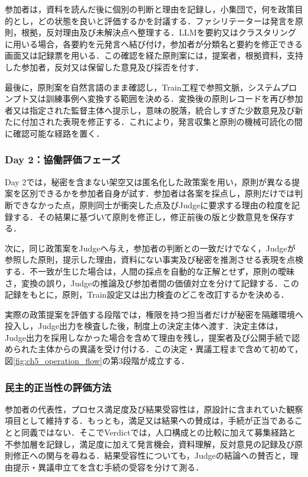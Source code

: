 参加者は，資料を読んだ後に個別の判断と理由を記録し，小集団で，何を政策目的とし，どの状態を良いと評価するかを討議する．ファシリテーターは発言を原則，根拠，反対理由及び未解決点へ整理する．LLMを要約又はクラスタリングに用いる場合，各要約を元発言へ結び付け，参加者が分類名と要約を修正できる画面又は記録票を用いる．この確認を経た原則案には，提案者，根拠資料，支持した参加者，反対又は保留した意見及び採否を付す．

最後に，原則案を自然言語のまま確認し，Train工程で参照文脈，システムプロンプト又は訓練事例へ変換する範囲を決める．変換後の原則レコードを再び参加者又は指定された監督主体へ提示し，意味の脱落，統合しすぎた少数意見及び新たに付加された表現を修正する．これにより，発言収集と原則の機械可読化の間に確認可能な経路を置く．

\subsubsection{Day 2：協働評価フェーズ}

Day 2では，秘密を含まない架空又は匿名化した政策案を用い，原則が異なる提案を区別できるかを参加者自身が試す．参加者は各案を採点し，原則だけでは判断できなかった点，原則同士が衝突した点及びJudgeに要求する理由の粒度を記録する．その結果に基づいて原則を修正し，修正前後の版と少数意見を保存する．

次に，同じ政策案をJudgeへ与え，参加者の判断との一致だけでなく，Judgeが参照した原則，提示した理由，資料にない事実及び秘密を推測させる表現を点検する．不一致が生じた場合は，人間の採点を自動的な正解とせず，原則の曖昧さ，変換の誤り，Judgeの推論及び参加者間の価値対立を分けて記録する．この記録をもとに，原則，Train設定又は出力検査のどこを改訂するかを決める．

実際の政策提案を評価する段階では，権限を持つ担当者だけが秘密を隔離環境へ投入し，Judge出力を検査した後，制度上の決定主体へ渡す．決定主体は，Judge出力を採用しなかった場合を含めて理由を残し，提案者及び公開手続で認められた主体からの異議を受け付ける．この決定・異議工程まで含めて初めて，図\ref{fig:ch5_operation_flow}の第3段階が成立する．

\subsubsection{民主的正当性の評価方法}

参加者の代表性，プロセス満足度及び結果受容性は，原設計に含まれていた観察項目として維持する．もっとも，満足又は結果への賛成は，手続が正当であることと同義ではない．そこでVerdictでは，人口構成との比較に加えて募集経路と不参加層を記録し，満足度に加えて発言機会，資料理解，反対意見の記録及び原則修正への関与を尋ねる．結果受容性についても，Judgeの結論への賛否と，理由提示・異議申立てを含む手続の受容を分けて測る．

